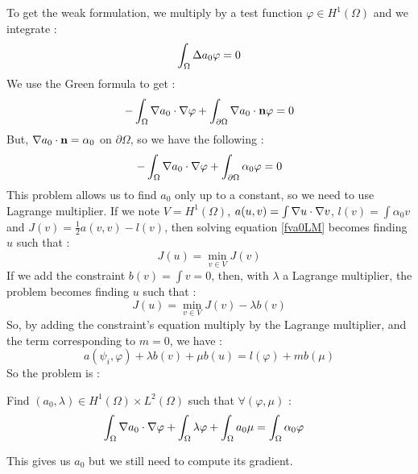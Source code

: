 To get the weak formulation, we multiply by a test function $\varphi\in H^1(\Omega)$ and we integrate :
\[ \int_\Omega {\Delta} a_0 \varphi = 0 \]
We use the Green formula to get :
\[ -\int_\Omega {\nabla} a_0\cdot{\nabla}\varphi + \int_{\partial\Omega} {\nabla} a_0\cdot {\mathbf{n}}\varphi = 0 \]
But, ${\nabla} a_0\cdot {\mathbf{n}} = \alpha_0$ on $\partial\Omega$, so we have the following :
\begin{equation}\label{fva0LM}
  -\int_\Omega {\nabla} a_0\cdot{\nabla}\varphi + \int_{\partial\Omega} \alpha_0\varphi = 0
\end{equation}
This problem allows us to find $a_0$ only up to a constant, so we need to use Lagrange multiplier.
\label{multLagrange}
If we note $V=H^1(\Omega)$, $a(u,v)=\int {\nabla} u \cdot {\nabla} v$, $l(v)=\int \alpha_0v$ and $J(v)=\frac{1}{2}a(v,v)-l(v)$, then solving equation \ref{fva0LM} becomes finding $u$ such that :
\[ J(u) = \min_{v\in V} J(v) \]
If we add the constraint $b(v) = \int v = 0$, then, with $\lambda$ a Lagrange multiplier, the problem becomes finding $u$ such that :
\[ J(u) = \min_{v\in V} J(v) - \lambda b(v) \]
So, by adding the constraint's equation multiply by the Lagrange multiplier, and the term corresponding to $m=0$, we have :
\[ a(\psi_i,\varphi) + \lambda b(v) + \mu b(u) = l(\varphi) + m b(\mu) \]
So the problem is :
\begin{pb}\label{fva0}
  Find $( a_0,\lambda)\in H^1(\Omega)\times L^2(\Omega)$ such that $\forall (\varphi,\mu)$ :
  \begin{align*}
    \int_\Omega {\nabla} a_0\cdot{\nabla}\varphi + \int_\Omega \lambda\varphi + \int_\Omega a_0\mu &= \int_\Omega \alpha_0\varphi
  \end{align*}
\end{pb}
\begin{rk}
  This gives us $a_0$ but we still need to compute its gradient.
\end{rk}

